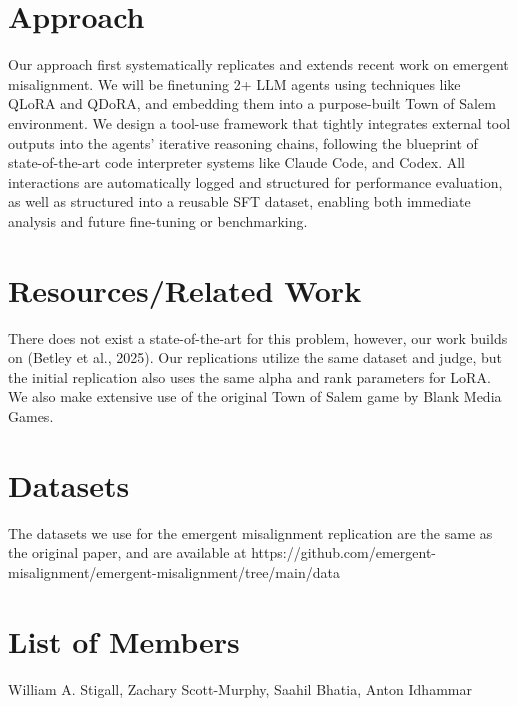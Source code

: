 \documentclass[10pt,onecolumn,letterpaper]{article}
\begin{document}
\section{Approach}
Our approach first systematically replicates and extends recent work on emergent misalignment. We will be finetuning 2+ LLM agents using techniques like QLoRA and QDoRA, and embedding them into a purpose-built Town of Salem environment\cite{dettmers2023qloraefficientfinetuningquantized}\cite{liu2024doraweightdecomposedlowrankadaptation}. We design a tool-use framework that tightly integrates external tool outputs into the agents' iterative reasoning chains, following the blueprint of state-of-the-art code interpreter systems like Claude Code, and Codex. All interactions are automatically logged and structured for performance evaluation, as well as structured into a reusable SFT dataset, enabling both immediate analysis and future fine-tuning or benchmarking. 
\section{Resources/Related Work}
There does not exist a state-of-the-art for this problem, however, our work builds on (Betley et al., 2025). Our replications utilize the same dataset and judge, but the initial replication also uses the same alpha and rank parameters for LoRA\cite{betley2025emergentmisalignmentnarrowfinetuning}. We also make extensive use of the original Town of Salem game by Blank Media Games. 
\section{Datasets}
The datasets we use for the emergent misalignment replication are the same as the original paper, and are available at https://github.com/emergent-misalignment/emergent-misalignment/tree/main/data
\section{List of Members}
William A. Stigall, Zachary Scott-Murphy, Saahil Bhatia, Anton Idhammar 



{\small


}
\end{document}
